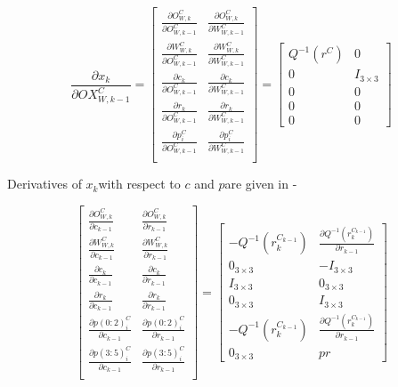 \begin{equation}
\frac{\partial x_{k}}{\partial OX_{W, k-1}^{C}}=\begin{bmatrix}
\frac{\partial O_{W,k}^{C}}{\partial O_{W,k-1}^{C}} & 
\frac{\partial O_{W,k}^{C}}{\partial W_{W,k-1}^{C}} \\
\frac{\partial W_{W,k}^{C}}{\partial O_{W,k-1}^{C}} & 
\frac{\partial W_{W,k}^{C}}{\partial W_{W,k-1}^{C}} \\
\frac{\partial c_{k}}{\partial O_{W,k-1}^{C}} &
\frac{\partial c_{k}}{\partial W_{W,k-1}^{C}} \\
\frac{\partial r_{k}}{\partial O_{W,k-1}^{C}} &
\frac{\partial r_{k}}{\partial W_{W,k-1}^{C}} \\
\frac{\partial p_{i}^{C}}{\partial O_{W,k-1}^{C}} & 
\frac{\partial p_{i}^{C}}{\partial W_{W,k-1}^{C}} \\
\end{bmatrix}= \begin{bmatrix}
Q^{-1}(r^{C}) & 0 \\
0 & I_{3\times 3} \\
0 & 0 \\
0 & 0 \\
0 & 0 
\end{bmatrix}
\end{equation}


Derivatives of $x_{k}$with respect to $c$ and $p$are given in - 


\begin{equation}
\begin{bmatrix}
\frac{\partial O_{W,k}^{C}}{\partial c_{k-1}} & 
\frac{\partial O_{W,k}^{C}}{\partial r_{k-1}} \\
\frac{\partial W_{W,k}^{C}}{\partial c_{k-1}} &
\frac{\partial W_{W,k}^{C}}{\partial r_{k-1}} \\
\frac{\partial c_{k}}{\partial c_{k-1}} & 
\frac{\partial c_{k}}{\partial r_{k-1}} \\
\frac{\partial r_{k}}{\partial c_{k-1}} & 
\frac{\partial r_{k}}{\partial r_{k-1}} \\
\frac{\partial p(0:2)_{i}^{C}}{\partial c_{k-1}} & 
\frac{\partial p(0:2)_{i}^{C}}{\partial r_{k-1}} \\
\frac{\partial p(3:5)_{i}^{C}}{\partial c_{k-1}} & 
\frac{\partial p(3:5)_{i}^{C}}{\partial r_{k-1}} \\
\end{bmatrix}= \begin{bmatrix}
-Q^{-1}(r_{k}^{C_{k-1}}) & 
\frac{\partial Q^{-1}(r_{k}^{C_{k-1}})}{\partial r_{k-1}} \\
0_{3\times 3} & -I_{3\times 3} \\
I_{3\times 3} & 0_{3\times 3} \\
0_{3\times 3} & I_{3\times 3} \\
-Q^{-1}(r_{k}^{C_{k-1}}) & 
\frac{\partial Q^{-1}(r_{k}^{C_{k-1}})}{\partial r_{k-1}} \\
0_{3\times 3} & pr 
\end{bmatrix}
\end{equation}


